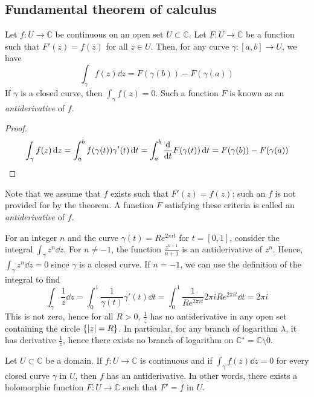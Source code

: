 \subsection{Fundamental theorem of calculus}
\begin{theorem}
	Let \( f \colon U \to \mathbb C \) be continuous on an open set \( U \subset \mathbb C \).
	Let \( F \colon U \to \mathbb C \) be a function such that \( F'(z) = f(z) \) for all \( z \in U \).
	Then, for any curve \( \gamma \colon [a,b] \to U \), we have
	\[ \int_\gamma f(z) \dd{z} = F(\gamma(b)) - F(\gamma(a)) \]
	If \( \gamma \) is a closed curve, then \( \int_\gamma f(z) = 0 \).
	Such a function \( F \) is known as an \textit{antiderivative} of \( f \).
\end{theorem}
\begin{proof}
	\[ \int_\gamma f(z) \dd{z} = \int_a^b f(\gamma(t)) \gamma'(t) \dd{t} = \int_a^b \dv{t} F(\gamma(t)) \dd{t} = F(\gamma(b)) - F(\gamma(a)) \]
\end{proof}
\begin{remark}
	Note that we assume that \( f \) exists such that \( F'(z) = f(z) \); such an \( f \) is not provided for by the theorem.
	A function \( F \) satisfying these criteria is called an \textit{antiderivative} of \( f \).
\end{remark}
\begin{example}
	For an integer \( n \) and the curve \( \gamma(t) = Re^{2\pi it} \) for \( t = [0,1] \), consider the integral \( \int_\gamma z^n \dd{z} \).
	For \( n \neq -1 \), the function \( \frac{z^{n+1}}{n+1} \) is an antiderivative of \( z^n \).
	Hence, \( \int_\gamma z^n \dd{z} = 0 \) since \( \gamma \) is a closed curve.
	If \( n = -1 \), we can use the definition of the integral to find
	\[ \int_\gamma \frac{1}{z} \dd{z} = \int_0^1 \frac{1}{\gamma(t)} \gamma'(t) \dd{t} = \int_0^1 \frac{1}{Re^{2\pi i t}}2\pi i R e^{2 \pi i t} \dd{t} = 2 \pi i \]
	This is not zero, hence for all \( R > 0 \), \( \frac{1}{z} \) has no antiderivative in any open set containing the circle \( \qty{\abs{z} = R} \).
	In particular, for any branch of logarithm \( \lambda \), it has derivative \( \frac{1}{z} \), hence there exists no branch of logarithm on \( \mathbb C^\star = \mathbb C \setminus \qty{0} \).
\end{example}
\begin{theorem}
	Let \( U \subset \mathbb C \) be a domain.
	If \( f \colon U \to \mathbb C \) is continuous and if \( \int_\gamma f(z) \dd{z} = 0 \) for every closed curve \( \gamma \) in \( U \), then \( f \) has an antiderivative.
	In other words, there exists a holomorphic function \( F \colon U \to \mathbb C \) such that \( F' = f \) in \( U \).
\end{theorem}
